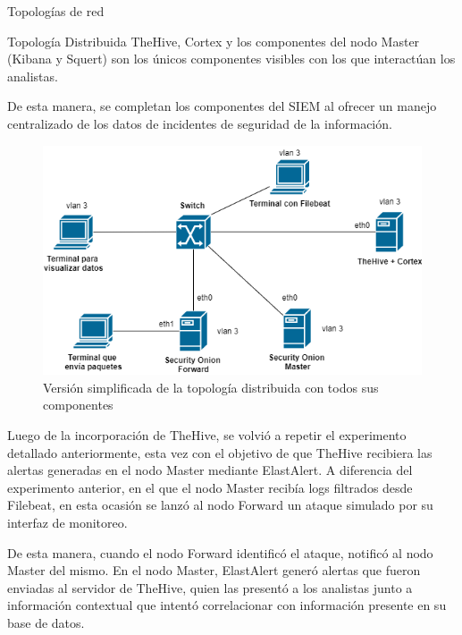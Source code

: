 \begin{section}{Topologías de red }
\begin{subsection} {Topología Distribuida}
            TheHive, Cortex y los componentes del nodo Master (Kibana y Squert) son los únicos componentes visibles con los que interactúan los analistas. \par
            De esta manera, se completan los componentes del SIEM al ofrecer un manejo centralizado de los datos de incidentes de seguridad de la información.\par
            \begin{figure}[H]
            \centering
             \includegraphics[width=1\textwidth]{./iteracion_1_imagenes/figura_33_c_topologia_de_prueba_3.png}
                \caption{Versión simplificada de la topología distribuida con todos sus componentes}
                \label{fig:topologia_distribuida_2}
            \end{figure}
            \FloatBarrier
            Luego de la incorporación de TheHive, se volvió a repetir el experimento detallado anteriormente, esta vez con el objetivo de que TheHive recibiera las alertas generadas en el nodo Master mediante ElastAlert. A diferencia del experimento anterior, en el que el nodo Master recibía logs filtrados desde Filebeat, en esta ocasión se lanzó al nodo Forward un ataque simulado por su interfaz de monitoreo.\par
            De esta manera, cuando el nodo Forward identificó el ataque, notificó al nodo Master del mismo. En el nodo Master, ElastAlert generó alertas que fueron enviadas al servidor de TheHive, quien las presentó a los analistas junto a información contextual que intentó correlacionar con información presente en su base de datos.\par
            \begin{figure}[H]

\end{figure}
\end{subsection}
\end{section}
